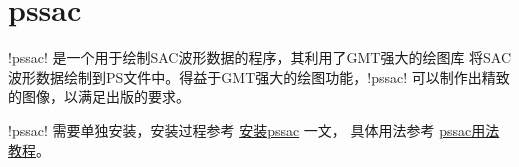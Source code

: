 \section{pssac}
\label{sec:pssac}

!pssac! 是一个用于绘制SAC波形数据的程序，其利用了GMT强大的绘图库
将SAC波形数据绘制到PS文件中。得益于GMT强大的绘图功能，!pssac!
可以制作出精致的图像，以满足出版的要求。

!pssac! 需要单独安装，安装过程参考
\href{http://seisman.info/install-pssac.html}{安装pssac} 一文，
具体用法参考 \href{http://seisman.info/pssac-notes.html}{pssac用法教程}。
